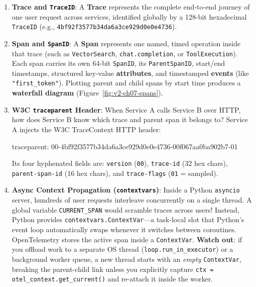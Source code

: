 \begin{enumerate}[leftmargin=18pt]
  \item \textbf{Trace and \texttt{TraceID}}: A \textbf{Trace} represents the complete end-to-end journey of one user request across services, identified globally by a 128-bit hexadecimal \texttt{TraceID} (e.g., \texttt{4bf92f3577b34da6a3ce929d0e0e4736}).
  \item \textbf{Span and \texttt{SpanID}}: A \textbf{Span} represents one named, timed operation inside that trace (such as \texttt{VectorSearch}, \texttt{chat.completion}, or \texttt{ToolExecution}). Each span carries its own 64-bit \texttt{SpanID}, its \texttt{ParentSpanID}, start/end timestamps, structured key-value \textbf{attributes}, and timestamped \textbf{events} (like \texttt{"first\_token"}). Plotting parent and child spans by start time produces a \textbf{waterfall diagram} (Figure~\ref{fig:v2-ch07-spans}).
  \item \textbf{W3C \texttt{traceparent} Header}: When Service A calls Service B over HTTP, how does Service B know which trace and parent span it belongs to? Service A injects the W3C TraceContext HTTP header:
  \begin{center}\small\ttfamily
  traceparent: 00-4bf92f3577b34da6a3ce929d0e0e4736-00f067aa0ba902b7-01
  \end{center}
  Its four hyphenated fields are: \texttt{version} (\texttt{00}), \texttt{trace-id} (32 hex chars), \texttt{parent-span-id} (16 hex chars), and \texttt{trace-flags} (\texttt{01} = sampled).
  \item \textbf{Async Context Propagation (\texttt{contextvars})}: Inside a Python \texttt{asyncio} server, hundreds of user requests interleave concurrently on a single thread. A global variable \texttt{CURRENT\_SPAN} would scramble traces across users! Instead, Python provides \texttt{contextvars.ContextVar}—a task-local slot that Python's event loop automatically swaps whenever it switches between coroutines. OpenTelemetry stores the active span inside a \texttt{ContextVar}. \textbf{Watch out}: if you offload work to a separate OS thread (\texttt{loop.run\_in\_executor}) or a background worker queue, a new thread starts with an \emph{empty} \texttt{ContextVar}, breaking the parent-child link unless you explicitly capture \texttt{ctx = otel\_context.get\_current()} and re-attach it inside the worker.
\end{enumerate}

